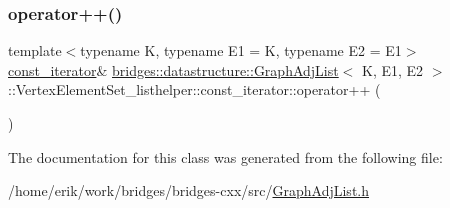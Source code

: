 \subsubsection{\texorpdfstring{operator++()}{operator++()}}
{\footnotesize\ttfamily template$<$typename K, typename E1 = K, typename E2 = E1$>$ \\
\hyperlink{classbridges_1_1datastructure_1_1_graph_adj_list_1_1_vertex_element_set__listhelper_1_1const__iterator}{const\+\_\+iterator}\& \hyperlink{classbridges_1_1datastructure_1_1_graph_adj_list}{bridges\+::datastructure\+::\+Graph\+Adj\+List}$<$ K, E1, E2 $>$\+::Vertex\+Element\+Set\+\_\+listhelper\+::const\+\_\+iterator\+::operator++ (\begin{DoxyParamCaption}{ }\end{DoxyParamCaption})\hspace{0.3cm}{\ttfamily [inline]}}



The documentation for this class was generated from the following file\+:\begin{DoxyCompactItemize}
\item 
/home/erik/work/bridges/bridges-\/cxx/src/\hyperlink{_graph_adj_list_8h}{Graph\+Adj\+List.\+h}\end{DoxyCompactItemize}
